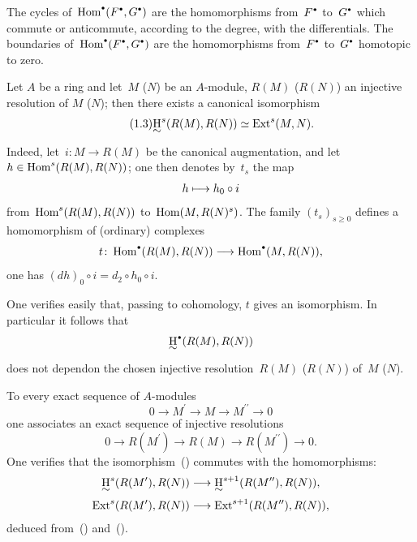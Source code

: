 \begin{remark} \label{V.1.2}
The cycles of~$\Hom^{\boule}(F^{\boule}, G^{\boule})$ are the homomorphisms from~$F^{\boule}$ to~$G^{\boule}$ which commute or anticommute, according to the degree, with the differentials. The boundaries of~$\Hom^{\boule}(F^{\boule}, G^{\boule})$ are the homomorphisms from~$F^{\boule}$ to~$G^{\boule}$ homotopic to zero.
\end{remark}

Let $A$ be a ring and let~$M$ (\resp $N$) be an $A$-module, $R(M)$ (\resp $R(N)$) an injective resolution of $M$ (\resp $N$); then there exists a canonical isomorphism
\begin{equation*} \label{eq:V.1.3} \tag{1.3} \uH^{s}(R(M), R(N))\simeq\Ext^{s}(M, N).
\end{equation*}
Indeed, let~$i\colon M\to R(M)$ be the canonical augmentation, and let $h\in\operatorname{Hom}^{s}(R(M), R(N))$; one then denotes by~$t_{s}$ the map
$$h\mto h_{0}\circ i$$
from~$\operatorname{Hom}^{s}(R(M), R(N))$ to~$\operatorname{Hom}(M, R(N)^s)$. The family $(t_{s})_{s\geq 0}$ defines a homomorphism of (ordinary) complexes
$$t\colon\Hom^{\boule}(R(M), R(N))\to\Hom^\boule(M, R(N)),
$$
\ie one has $(dh)_{0}\circ i= d_{2}\circ h_{0}\circ i.$

One verifies easily that, passing to cohomology, $t$ gives an isomorphism. In particular it follows that
$$
\uH^{\boule}(R(M), R(N))$$
does \og not depend\fg on the chosen injective resolution~$R(M)$ (\resp $R(N)$) of~$M$ (\resp $N$).

To every exact sequence of $A$-modules
\begin{equation} \label{eq:V.5} 0\to M^{\prime}\to M\to M^{\prime\prime}\to 0
\end{equation}
one associates an exact sequence of injective resolutions
\begin{equation} \label{eq:V.6} 0\to R(M^{\prime})\to R(M)\to R(M^{\prime\prime})\to 0.
\end{equation}
One verifies that the isomorphism~() commutes with the homomorphisms: \setcounter{equation}{7}
\begin{align} \label{eq:V.8}
\uH^{s}(R(M^{\prime}), R(N))&\to \uH^{s+1}(R(M^{\prime\prime}), R(N)),\\
\label{eq:V.9} \Ext^{s}(R(M^{\prime}), R(N))&\to\Ext^{s+1}(R(M^{\prime\prime}), R(N)),
\end{align}
deduced from~() and~().

